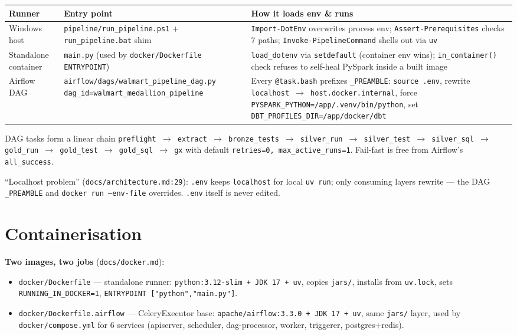 \documentclass[11pt,a4paper]{article}
\begin{document}
\begin{center}
\begin{longtable}{l p{5.6cm} p{5.6cm}}
\toprule
Runner & Entry point & How it loads env \& runs \\
\midrule
\endhead
Windows host & \texttt{pipeline/run\_pipeline.ps1} + \texttt{run\_pipeline.bat} shim & \texttt{Import-DotEnv} overwrites process env; \texttt{Assert-Prerequisites} checks 7 paths; \texttt{Invoke-PipelineCommand} shells out via \texttt{uv} \\
Standalone container & \texttt{main.py} (used by \texttt{docker/Dockerfile} \texttt{ENTRYPOINT}) & \texttt{load\_dotenv} via \texttt{setdefault} (container env wins); \texttt{in\_container()} check refuses to self-heal PySpark inside a built image \\
Airflow DAG & \texttt{airflow/dags/walmart\_pipeline\_dag.py} \newline \texttt{dag\_id=walmart\_medallion\_pipeline} & Every \texttt{@task.bash} prefixes \texttt{\_PREAMBLE}: \texttt{source .env}, rewrite \texttt{localhost $\rightarrow$ host.docker.internal}, force \texttt{PYSPARK\_PYTHON=/app/.venv/bin/python}, set \texttt{DBT\_PROFILES\_DIR=/app/docker/dbt} \\
\bottomrule
\end{longtable}
\end{center}

DAG tasks form a linear chain \texttt{preflight $\rightarrow$ extract $\rightarrow$ bronze\_tests $\rightarrow$ silver\_run $\rightarrow$ silver\_test $\rightarrow$ silver\_sql $\rightarrow$ gold\_run $\rightarrow$ gold\_test $\rightarrow$ gold\_sql $\rightarrow$ gx} with default \texttt{retries=0, max\_active\_runs=1}. Fail-fast is free from Airflow's \texttt{all\_success}.

``Localhost problem'' (\texttt{docs/architecture.md:29}): \texttt{.env} keeps \texttt{localhost} for local \texttt{uv run}; only consuming layers rewrite — the DAG \texttt{\_PREAMBLE} and \texttt{docker run --env-file} overrides. \texttt{.env} itself is never edited.

\section{Containerisation}

\textbf{Two images, two jobs} (\texttt{docs/docker.md}):
\begin{itemize}[leftmargin=1.4em]
  \item \texttt{docker/Dockerfile} — standalone runner: \texttt{python:3.12-slim + JDK 17 + uv}, copies \texttt{jars/}, installs from \texttt{uv.lock}, sets \texttt{RUNNING\_IN\_DOCKER=1}, \texttt{ENTRYPOINT ["python","main.py"]}.
  \item \texttt{docker/Dockerfile.airflow} — CeleryExecutor base: \texttt{apache/airflow:3.3.0 + JDK 17 + uv}, same \texttt{jars/} layer, used by \texttt{docker/compose.yml} for 6 services (apiserver, scheduler, dag-processor, worker, triggerer, postgres+redis).
\end{itemize}
\end{document}
